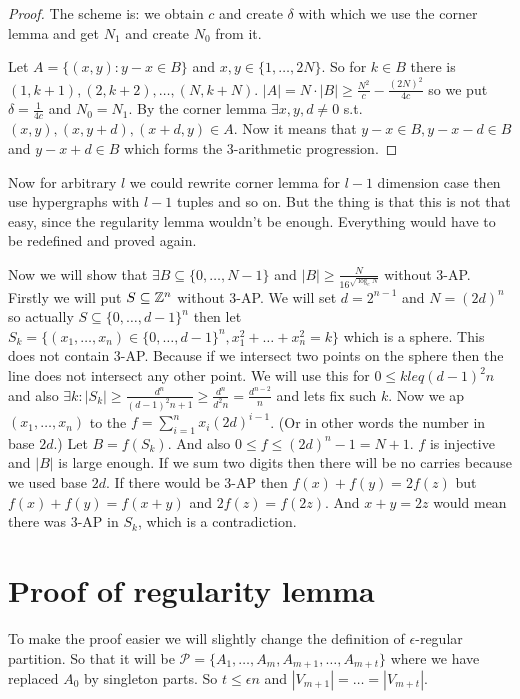 \begin{proof}
	The scheme is: we obtain $c$ and create $\delta$ with which we use the corner lemma and get $N_1$ and create $N_0$ from it.
	
	Let $A = \{(x,y) : y-x \in B\}$ and $x,y \in \{1, \dots, 2N\}$. So for $k \in B$ there is $(1,k+1), (2,k+2), \dots, (N, k+N)$. $|A| = N \cdot |B| \geq \frac{N^2}{c} - \frac{(2N)^2}{4c}$ so we put $\delta = \frac{1}{4c}$ and $N_0 = N_1$. By the corner lemma $\exists x,y,d \neq 0$ s.t. $(x,y), (x,y+d), (x+d,y) \in A$. Now it means that $y-x \in B, y-x -d \in B$ and $y-x+d \in B$ which forms the 3-arithmetic progression.
\end{proof}

Now for arbitrary $l$ we could rewrite corner lemma for $l-1$ dimension case then use hypergraphs with $l-1$ tuples and so on. But the thing is that this is not that easy, since the regularity lemma wouldn't be enough. Everything would have to be redefined and proved again. %

Now we will show that $\exists B \subseteq \{0, \dots, N-1\}$ and $|B| \geq \frac{N}{16^{\sqrt{\log_e N}}}$ without 3-AP. Firstly we will put $S \subseteq \mathbb{Z}^n$ without 3-AP. We will set $d = 2^{n-1}$ and $N = (2d)^n$ so actually $S \subseteq \{0, \dots, d-1\}^n$ then let $S_k = \{(x_1, \dots, x_n) \in \{0, \dots, d-1\}^n, x_1^2 + \dots + x_n^2 = k\}$ which is a sphere. This does not contain 3-AP. Because if we intersect two points on the sphere then the line does not intersect any other point. We will use this for $0 \leq k leq (d-1)^2n$ and also $\exists k: |S_k| \geq \frac{d^n}{(d-1)^2n+1} \geq \frac{d^n}{d^2n} = \frac{d^{n-2}}{n}$ and lets fix such $k$. Now we ap $(x_1, \dots, x_n)$ to the $f = \sum_{i = 1}^n x_i (2d)^{i-1}$. (Or in other words the number in base $2d$.) Let $B = f(S_k)$. And also $0 \leq f \leq (2d)^n - 1 = N +1$. $f$ is injective and $|B|$ is large enough. If we sum two digits then there will be no carries because we used base $2d$. If there would be 3-AP then $f(x) + f(y) = 2f(z)$ but $f(x) + f(y) = f(x + y)$ and $2f(z) = f(2z)$. And $x + y = 2z$ would mean there was 3-AP in $S_k$, which is a contradiction.

\section{Proof of regularity lemma}

To make the proof easier we will slightly change the definition of $\epsilon$-regular partition. So that it will be $\mathcal{P} = \{A_1, \dots, A_m, A_{m+1}, \dots, A_{m+t}\}$ where we have replaced $A_0$ by singleton parts. So $t \leq \epsilon n$ and $|V_{m+1}| = \dots = |V_{m+t}|$.

